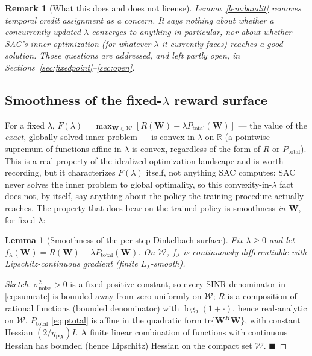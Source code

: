 \documentclass[11pt]{article}
\newtheorem{lemma}{Lemma}
\newtheorem{remark}{Remark}
\begin{document}
\begin{remark}[What this does and does not license]
Lemma~\ref{lem:bandit} removes temporal credit assignment as a concern. It
says nothing about whether a concurrently-updated $\lambda$ converges to
anything in particular, nor about whether SAC's inner optimization (for
whatever $\lambda$ it currently faces) reaches a good solution. Those
questions are addressed, and left partly open, in
Sections~\ref{sec:fixedpoint}--\ref{sec:open}.
\end{remark}

\subsection{Smoothness of the fixed-$\lambda$ reward surface}
\label{sec:smooth-fact}

For a fixed $\lambda$, $F(\lambda) =
\max_{\mathbf{W}\in\mathcal{W}}[R(\mathbf{W})-\lambda P_{\text{total}}(\mathbf{W})]$
--- the value of the \emph{exact}, globally-solved inner problem --- is
convex in $\lambda$ on $\mathbb{R}$ (a pointwise supremum of functions affine
in $\lambda$ is convex, regardless of the form of $R$ or $P_{\text{total}}$).
This is a real property of the idealized optimization landscape and is
worth recording, but it characterizes $F(\lambda)$ itself, not anything SAC
computes: SAC never solves the inner problem to global optimality, so this
convexity-in-$\lambda$ fact does not, by itself, say anything about the
policy the training procedure actually reaches. The property that does
bear on the trained policy is smoothness \emph{in $\mathbf{W}$}, for fixed
$\lambda$:

\begin{lemma}[Smoothness of the per-step Dinkelbach surface]
\label{lem:smooth}
Fix $\lambda\ge0$ and let $f_\lambda(\mathbf{W}) = R(\mathbf{W}) - \lambda
P_{\text{total}}(\mathbf{W})$. On $\mathcal{W}$, $f_\lambda$ is continuously
differentiable with Lipschitz-continuous gradient (finite $L_\lambda$-smooth).
\end{lemma}
\begin{proof}[Sketch]
$\sigma_{\text{noise}}^2>0$ is a fixed positive constant, so every SINR
denominator in \eqref{eq:sumrate} is bounded away from zero uniformly on
$\mathcal{W}$; $R$ is a composition of rational functions (bounded
denominator) with $\log_2(1+\cdot)$, hence real-analytic on $\mathcal{W}$.
$P_{\text{total}}$ \eqref{eq:ptotal} is affine in the quadratic form
$\mathrm{tr}\{\mathbf{W}^H\mathbf{W}\}$, with constant Hessian
$(2/\eta_{\text{PA}})I$. A finite linear combination of functions with
continuous Hessian has bounded (hence Lipschitz) Hessian on the compact set
$\mathcal{W}$. $\blacksquare$
\end{proof}
\end{document}
